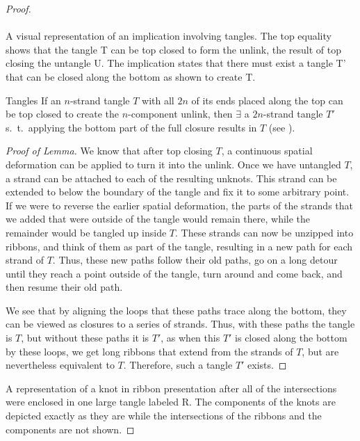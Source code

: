 \begin{paper}
\begin{proof}
{\vspace{-4em}\hspace{0.3in}\hspace{14.8ex}\\

\vspace{-4.3em}\hfill{}\\}
{A visual representation of an implication involving tangles.
The top equality shows that the tangle T can be top closed to
form the unlink, the result of top closing the untangle U.
The implication states that there must exist a tangle T' that can be closed
along the bottom as shown to create T.}

\begin{paperlem}{Tangles}
If an $n$-strand tangle $T$ with all $2n$ of its ends placed along the top can
be top closed to create the $n$-component unlink, then $\exists$ a $2n$-strand
tangle $T'$ s.~t.~applying the bottom part of the full closure results in $T$
(see \figLemma).
\end{paperlem}

\begin{proof}[Proof of Lemma]
We know that after top closing $T$, a continuous spatial deformation can be
applied to turn it into the unlink.
Once we have untangled $T$, a strand can be attached to each of the resulting
unknots.
This strand can be extended to below the boundary of the tangle and fix it to
some arbitrary point.
If we were to reverse the earlier spatial deformation, the parts of the strands
that we added that were outside of the tangle would remain there, while the
remainder would be tangled up inside $T$.
These strands can now be unzipped into ribbons, and think of them as part of the
tangle, resulting in a new path for each strand of $T$.
Thus, these new paths follow their old paths, go on a long detour until they
reach a point outside of the tangle, turn around and come back, and then resume
their old path.

We see that by aligning the loops that these paths trace along the bottom,
they can be viewed as closures to a series of strands.
Thus, with these paths the tangle is $T$, but without these paths it is $T'$,
as when this $T'$ is closed along the bottom by these loops, we get long ribbons
that extend from the strands of $T$, but are nevertheless equivalent to $T$.
Therefore, such a tangle $T'$ exists.
\end{proof}

{A representation of a knot in ribbon presentation after all of the
intersections were enclosed in one large tangle labeled R.
The components of the knots are depicted exactly as they are while the
intersections of the ribbons and the components are not shown.}


\end{proof}
\end{paper}
